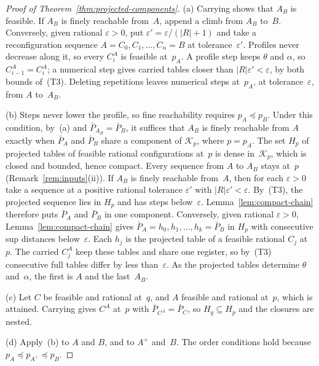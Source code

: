 \begin{proof}[Proof of Theorem~\ref{thm:projected-components}]
(a) Carrying shows that $A_B$ is feasible. If $A_B$ is finely reachable
from~$A$, append a climb from $A_B$ to~$B$. Conversely, given rational
$\varepsilon>0$, put $\varepsilon'=\varepsilon/(|R|+1)$ and take a
reconfiguration sequence $A=C_0,C_1,\dots,C_n=B$ at
tolerance~$\varepsilon'$. Profiles never decrease along it, so every
$C_i^A$ is feasible at~$p_A$. A profile step keeps $\theta$ and $\alpha$,
so $C_{i-1}^A=C_i^A$; a numerical step gives carried tables closer than
$|R|\varepsilon'<\varepsilon$, by both bounds of~(T3). Deleting repetitions
leaves numerical steps at~$p_A$, at tolerance~$\varepsilon$, from $A$
to~$A_B$.

(b) Steps never lower the profile, so fine reachability requires
$p_A\preceq p_B$. Under this condition, by~(a) and
$\bar P_{A_B}=\bar P_B$, it suffices that $A_B$ is finely reachable from
$A$ exactly when $\bar P_A$ and $\bar P_B$ share a component of
$\mathcal K_p$, where $p=p_A$. The set $H_p$
of projected tables of feasible rational configurations at~$p$ is dense
in~$\mathcal K_p$, which is closed and bounded, hence compact. Every
sequence from $A$ to $A_B$ stays at~$p$ (Remark~\ref{rem:inputs}(ii)). %
If $A_B$ is finely reachable from~$A$, then for each $\varepsilon>0$ take a
sequence at a positive rational tolerance $\varepsilon'$ with
$|R|\varepsilon'<\varepsilon$. By~(T3), the projected sequence lies in
$H_p$ and has steps below~$\varepsilon$. Lemma~\ref{lem:compact-chain}
therefore puts $\bar P_A$ and $\bar P_B$ in one component. Conversely, given rational $\varepsilon>0$,
Lemma~\ref{lem:compact-chain} gives $\bar P_A=h_0,h_1,\dots,h_k=\bar P_B$
in $H_p$ with consecutive sup distances below~$\varepsilon$. Each $h_j$ is
the projected table of a feasible rational $C_j$ at~$p$. The carried
$C_j^A$ keep these tables and share one register, so by~(T3) consecutive
full tables differ by less than~$\varepsilon$. As the
projected tables determine $\theta$ and~$\alpha$, the first is $A$ and the
last~$A_B$.

(c) Let $C$ be feasible and rational at~$q$, and $A$ feasible and rational
at~$p$, which is attained. Carrying gives $C^A$ at~$p$ with
$\bar P_{C^A}=\bar P_C$, so $H_q\subseteq H_p$ and the closures are
nested.

(d) Apply~(b) to $A$ and $B$, and to $A^+$ and~$B$. The order conditions
hold because $p_A\preceq p_{A^+}\preceq p_B$.
\end{proof}

